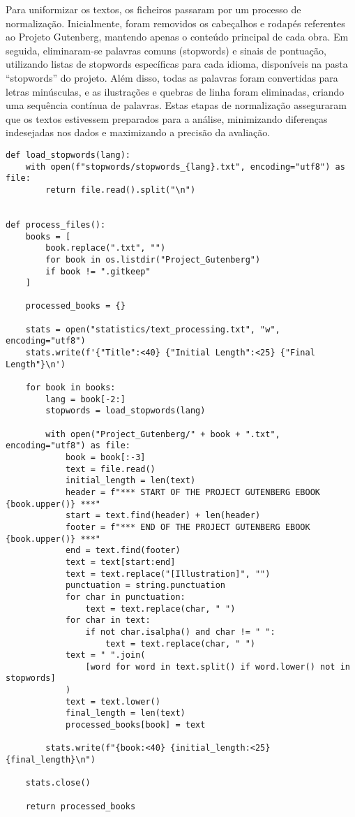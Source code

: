 \documentclass[shortpaper, portugues, times, mirror]{revdetua}
\begin{document}
Para uniformizar os textos, os ficheiros passaram por um processo de normalização. Inicialmente, foram removidos os cabeçalhos e rodapés referentes ao Projeto Gutenberg, mantendo apenas o conteúdo principal de cada obra. Em seguida, eliminaram-se palavras comuns (stopwords) e sinais de pontuação, utilizando listas de stopwords específicas para cada idioma, disponíveis na pasta “stopwords” do projeto. Além disso, todas as palavras foram convertidas para letras minúsculas, e as ilustrações e quebras de linha foram eliminadas, criando uma sequência contínua de palavras. Estas etapas de normalização asseguraram que os textos estivessem preparados para a análise, minimizando diferenças indesejadas nos dados e maximizando a precisão da avaliação.
\begin{lstlisting}
def load_stopwords(lang):
    with open(f"stopwords/stopwords_{lang}.txt", encoding="utf8") as file:
        return file.read().split("\n")


def process_files():
    books = [
        book.replace(".txt", "")
        for book in os.listdir("Project_Gutenberg")
        if book != ".gitkeep"
    ]

    processed_books = {}

    stats = open("statistics/text_processing.txt", "w", encoding="utf8")
    stats.write(f'{"Title":<40} {"Initial Length":<25} {"Final Length"}\n')

    for book in books:
        lang = book[-2:]
        stopwords = load_stopwords(lang)

        with open("Project_Gutenberg/" + book + ".txt", encoding="utf8") as file:
            book = book[:-3]
            text = file.read()
            initial_length = len(text)
            header = f"*** START OF THE PROJECT GUTENBERG EBOOK {book.upper()} ***"
            start = text.find(header) + len(header)
            footer = f"*** END OF THE PROJECT GUTENBERG EBOOK {book.upper()} ***"
            end = text.find(footer)
            text = text[start:end]
            text = text.replace("[Illustration]", "")
            punctuation = string.punctuation
            for char in punctuation:
                text = text.replace(char, " ")
            for char in text:
                if not char.isalpha() and char != " ":
                    text = text.replace(char, " ")
            text = " ".join(
                [word for word in text.split() if word.lower() not in stopwords]
            )
            text = text.lower()
            final_length = len(text)
            processed_books[book] = text

        stats.write(f"{book:<40} {initial_length:<25} {final_length}\n")

    stats.close()

    return processed_books
\end{lstlisting}
\end{document}
